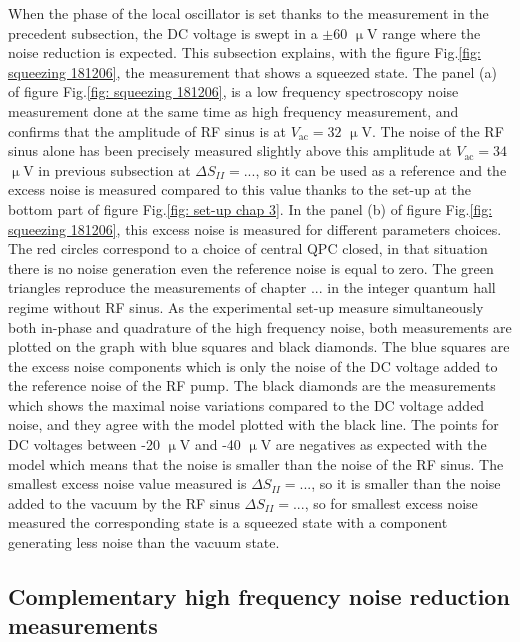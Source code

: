 When the phase of the local oscillator is set thanks to the measurement in the precedent subsection, the DC voltage is swept in a $\pm 60$ $\upmu$V range where the noise reduction is expected.
This subsection explains, with the figure Fig.\ref{fig: squeezing 181206}, the measurement that shows a squeezed state.
The panel (a) of figure Fig.\ref{fig: squeezing 181206}, is a low frequency spectroscopy noise measurement done at the same time as high frequency measurement, and confirms that the amplitude of RF sinus is at $V_{\mathrm{ac}} = 32$ $\upmu$V.
The noise of the RF sinus alone has been precisely measured slightly above this amplitude at $V_{\mathrm{ac}} = 34$ $\upmu$V in previous subsection at $\Delta S_{II} = ...$, so it can be used as a reference and the excess noise is measured compared to this value thanks to the set-up at the bottom part of figure Fig.\ref{fig: set-up chap 3}.
In the panel (b) of figure Fig.\ref{fig: squeezing 181206}, this excess noise is measured for different parameters choices.
The red circles correspond to a choice of central QPC closed, in that situation there is no noise generation even the reference noise is equal to zero.
The green triangles reproduce the measurements of chapter ... in the integer quantum hall regime without RF sinus.
As the experimental set-up measure simultaneously both in-phase and quadrature of the high frequency noise, both measurements are plotted on the graph with blue squares and black diamonds.
The blue squares are the excess noise components which is only the noise of the DC voltage added to the reference noise of the RF pump.
The black diamonds are the measurements which shows the maximal noise variations compared to the DC voltage added noise, and they agree with the model plotted with the black line.
The points for DC voltages between -20 $\upmu$V and -40 $\upmu$V are negatives as expected with the model which means that the noise is smaller than the noise of the RF sinus.
The smallest excess noise value measured is $\Delta S_{II} = ...$, so it is smaller than the noise added to the vacuum by the RF sinus $\Delta S_{II} = ...$, so for smallest excess noise measured the corresponding state is a squeezed state with a component generating less noise than the vacuum state. 

\subsection{Complementary high frequency noise reduction measurements}

